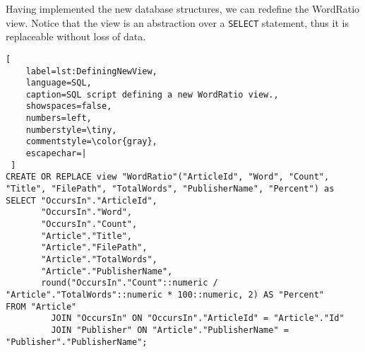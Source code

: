 Having implemented the new database structures, we can redefine the WordRatio view.
Notice that the view is an abstraction over a \texttt{SELECT} statement, thus it is replaceable without loss of data.


\begin{lstlisting}[
    label=lst:DefiningNewView,
    language=SQL,
    caption=SQL script defining a new WordRatio view.,
    showspaces=false,
    numbers=left,
    numberstyle=\tiny,
    commentstyle=\color{gray},
    escapechar=|
 ]
CREATE OR REPLACE view "WordRatio"("ArticleId", "Word", "Count", "Title", "FilePath", "TotalWords", "PublisherName", "Percent") as
SELECT "OccursIn"."ArticleId",
       "OccursIn"."Word",
       "OccursIn"."Count",
       "Article"."Title",
       "Article"."FilePath",
       "Article"."TotalWords",
       "Article"."PublisherName",
       round("OccursIn"."Count"::numeric / "Article"."TotalWords"::numeric * 100::numeric, 2) AS "Percent"
FROM "Article"
         JOIN "OccursIn" ON "OccursIn"."ArticleId" = "Article"."Id"
         JOIN "Publisher" ON "Article"."PublisherName" = "Publisher"."PublisherName";
\end{lstlisting}
